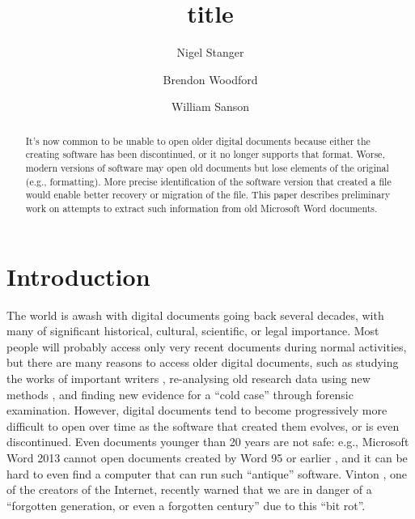 \documentclass[12pt]{article}
\title{title}
\author{Nigel Stanger \and Brendon Woodford \and William Sanson}
\begin{document}
\maketitle
\thispagestyle{empty}

\begin{abstract}
It’s now common to be unable to open older digital documents because either the creating software has been discontinued, or it no longer supports that format. Worse, modern versions of software may open old documents but lose elements of the original (e.g., formatting). More precise identification of the software version that created a file would enable better recovery or migration of the file. This paper describes preliminary work on attempts to extract such information from old Microsoft Word documents.
\end{abstract}

\section{Introduction}

The world is awash with digital documents going back several decades, with many of significant historical, cultural, scientific, or legal importance. Most people will probably access only very recent documents during normal activities, but there are many reasons to access older digital documents, such as studying the works of important writers \cite{Kolowich.S-2009a-Archiving}, re-analysing old research data using new methods \cite{Mount.R-2009a-Data,Pringle.H-2010a-NASA}, and finding new evidence for a “cold case” through forensic examination. However, digital documents tend to become progressively more difficult to open over time as the software that created them evolves, or is even discontinued. Even documents younger than 20 years are not safe: e.g., Microsoft Word 2013 cannot open documents created by Word 95 or earlier \cite{Microsoft-2014a-Word2013}, and it can be hard to even find a computer that can run such “antique” software. Vinton , one of the creators of the Internet, recently warned that we are in danger of a “forgotten generation, or even a forgotten century” due to this “bit rot”.
\end{document}
